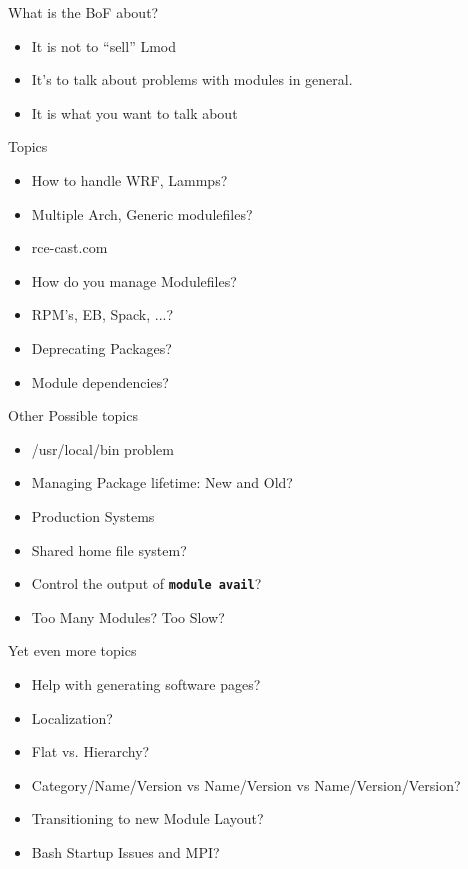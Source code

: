 \documentclass{beamer}
\begin{document}
\begin{frame}{What is the BoF about?}
  \begin{itemize}
    \item It is not to ``sell'' Lmod
    \item It's to talk about problems with modules in general.
    \item It is what you want to talk about
  \end{itemize}
\end{frame}


\begin{frame}{Topics}
  \begin{itemize}
    \item How to handle WRF, Lammps?
    \item Multiple Arch, Generic modulefiles?
    \item rce-cast.com
    \item How do you manage Modulefiles?
    \item RPM's, EB, Spack, ...?
    \item Deprecating Packages?
    \item Module dependencies?
  \end{itemize}
\end{frame}

\begin{frame}{Other Possible topics}
  \begin{itemize}
    \item /usr/local/bin problem
    \item Managing Package lifetime: New and Old?
    \item Production Systems
    \item Shared home file system?
    \item Control the output of \texttt{\bf module avail}?
    \item Too Many Modules? Too Slow?
  \end{itemize}
\end{frame}


\begin{frame}{Yet even more topics}
  \begin{itemize}
    \item Help with generating software pages?
    \item Localization?
    \item Flat vs. Hierarchy?
    \item Category/Name/Version vs Name/Version vs
      Name/Version/Version?
    \item Transitioning to new Module Layout?
    \item Bash Startup Issues and MPI?
  \end{itemize}
\end{frame}
\end{document}
